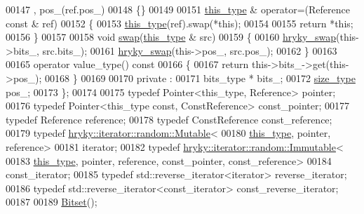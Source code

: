 \begin{DoxyCode}
00147               , pos\_(ref.pos\_)
00148         \{\}
00149 
00151         \hyperlink{classhryky_1_1_bitset_a967bec88789e12e2ca96e7a73907822c}{this_type} & operator=(Reference \textcolor{keyword}{const} & ref)
00152         \{
00153             \hyperlink{classhryky_1_1_bitset_a967bec88789e12e2ca96e7a73907822c}{this_type}(ref).swap(*\textcolor{keyword}{this});
00154 
00155             \textcolor{keywordflow}{return} *\textcolor{keyword}{this};
00156         \}
00157 
00158         \textcolor{keywordtype}{void} \hyperlink{classhryky_1_1_bitset_a85e9dae700136067e615b385ea8f4e14}{swap}(\hyperlink{classhryky_1_1_bitset_a967bec88789e12e2ca96e7a73907822c}{this_type} & src)
00159         \{
00160             \hyperlink{namespacehryky_add9c1c1fdfda07cd47bcb7c16d3a823a}{hryky_swap}(this->bits\_, src.bits\_);
00161             \hyperlink{namespacehryky_add9c1c1fdfda07cd47bcb7c16d3a823a}{hryky_swap}(this->pos\_, src.pos\_);
00162         \}
00163 
00165         operator value\_type()\textcolor{keyword}{ const}
00166 \textcolor{keyword}{        }\{
00167             \textcolor{keywordflow}{return} this->bits\_->get(this->pos\_);
00168         \}
00169 
00170     \textcolor{keyword}{private} :
00171         bits\_type * bits\_;
00172         \hyperlink{namespacehryky_1_1display_a88ee3bfa154cce4c6715af0c3f53d062}{size_type} pos\_;
00173     \};
00174 
00175     \textcolor{keyword}{typedef} Pointer<this\_type, Reference>               pointer;
00176     \textcolor{keyword}{typedef} Pointer<this\_type const, ConstReference>    const\_pointer;
00177     \textcolor{keyword}{typedef} Reference                                   reference;
00178     \textcolor{keyword}{typedef} ConstReference                              const\_reference;
00179     \textcolor{keyword}{typedef} \hyperlink{classhryky_1_1iterator_1_1random_1_1_mutable}{hryky::iterator::random::Mutable}<
00180         \hyperlink{classhryky_1_1_bitset_a967bec88789e12e2ca96e7a73907822c}{this_type}, pointer, reference>
00181             iterator;
00182     \textcolor{keyword}{typedef} \hyperlink{classhryky_1_1iterator_1_1random_1_1_immutable}{hryky::iterator::random::Immutable}<
00183         \hyperlink{classhryky_1_1_bitset_a967bec88789e12e2ca96e7a73907822c}{this_type}, pointer, reference, const\_pointer, const\_reference>
00184             const\_iterator;
00185     \textcolor{keyword}{typedef} std::reverse\_iterator<iterator>             reverse\_iterator;
00186     \textcolor{keyword}{typedef} std::reverse\_iterator<const\_iterator>       const\_reverse\_iterator;
00187 
00189     \hyperlink{classhryky_1_1_bitset_a28b1c686a006ded6ee81b0d3ea38d608}{Bitset}();

\end{DoxyCode}
